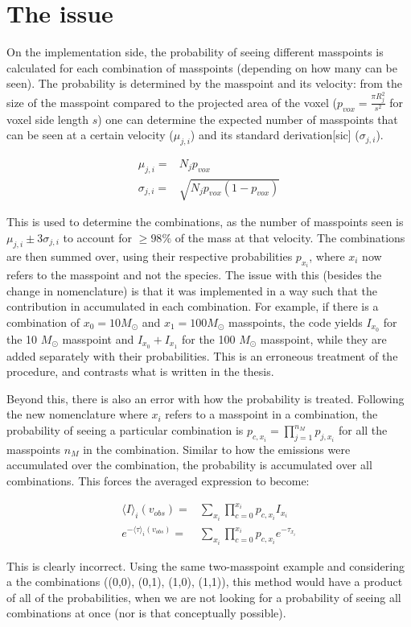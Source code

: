 \documentclass[amsmath,align]{paper}
\begin{document}
  \section{The issue}
  On the implementation side, the probability of seeing different masspoints is calculated for each combination of masspoints (depending on how many can be seen). The probability is determined by the masspoint and its velocity: from the size of the masspoint compared to the projected area of the voxel ($p_{vox}=\frac{\pi R_j^2}{s^2}$ for voxel side length $s$) one can determine the expected number of masspoints that can be seen at a certain velocity ($\mu_{j,i}$) and its standard derivation[sic] ($\sigma_{j,i}$).
  
  \begin{align}
    \mu_{j,i} =& N_j p_{vox} \\
    \sigma_{j,i} =& \sqrt{N_j p_{vox} (1-p_{vox})}
  \end{align}
  
  This is used to determine the combinations, as the number of masspoints seen is $\mu_{j,i} \pm 3\sigma_{j,i}$ to account for $\geq 98 \%$ of the mass at that velocity. The combinations are then summed over, using their respective probabilities $p_{x_i}$, where $x_i$ now refers to the masspoint and not the species. The issue with this (besides the change in nomenclature) is that it was implemented in a way such that the contribution in accumulated in each combination. For example, if there is a combination of $x_0 = 10 M_\odot$ and $x_1 = 100 M_\odot$ masspoints, the code yields $I_{x_0}$ for the 10 $M_\odot$ masspoint and $I_{x_0}+I_{x_1}$ for the 100 $M_\odot$ masspoint, while they are added separately with their probabilities. This is an erroneous treatment of the procedure, and contrasts what is written in the thesis.
  
  Beyond this, there is also an error with how the probability is treated. Following the new nomenclature where $x_i$ refers to a masspoint in a combination, the probability of seeing a particular combination is $p_{c,x_i} = \prod_{j=1}^{n_M} p_{j,x_i}$ for all the masspoints $n_M$ in the combination. Similar to how the emissions were accumulated over the combination, the probability is accumulated over all combinations. This forces the averaged expression to become:
  
  \begin{align}
    \langle I \rangle_i(v_{obs}) =& \sum_{x_i} \prod_{c=0}^{x_i} p_{c,x_i} I_{x_i} \\
    e^{-\langle \tau \rangle_i(v_{obs})} =& \sum_{x_i} \prod_{c=0}^{x_i} p_{c,x_i} e^{-\tau_{x_i}}
  \end{align}
  
  This is clearly incorrect. Using the same two-masspoint example and considering a the combinations ((0,0), (0,1), (1,0), (1,1)), this method would have a product of all of the probabilities, when we are not looking for a probability of seeing all combinations at once (nor is that conceptually possible). 
\end{document}
